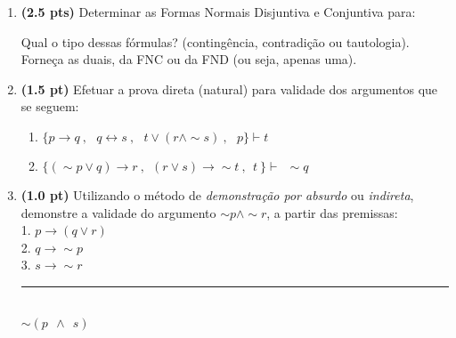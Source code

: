 \documentclass[11pt, a4paper,final]{article}
\begin{document}
\begin{enumerate}

\item {\bf (2.5 pts)} Determinar as Formas Normais Disjuntiva e Conjuntiva para:

Qual o tipo dessas fórmulas? (contingência, contradição ou tautologia). Forneça as duais,
da FNC ou  da FND (ou seja, apenas uma).

\item {\bf (1.5 pt)} Efetuar a prova  direta (natural) para validade dos argumentos que se seguem: 


\begin{enumerate}
\item $\{p\rightarrow  q \: , \:\:\: q \leftrightarrow s \: , \:\:\:
 t \vee ( r \wedge \sim s)\: , \:\:\: p \} \vdash  t $ 
 
\item  $\{ ( \sim p \vee q) \rightarrow r \: ,
  \:\: (r \vee s)  \rightarrow \sim t \: ,
    \:\: t \:   \} \vdash \: \:  \sim  q $
    
\end{enumerate}

\begin{comment}
\begin{enumerate}
\item $\{p\rightarrow \sim q \: , \:\:\: \sim p \rightarrow (r \rightarrow \sim q)  \: , \:\:\:
 (\sim s \vee \sim r)\rightarrow \sim \sim q  \: , \:\:\: \sim s  \} \vdash  r $ 
 
\item  $\{ p \vee q \: ,
  \:\: q \rightarrow r \: ,
    \:\: p \rightarrow s \: ,
     \:\: \sim s   \} \vdash r \wedge (p \vee q) $
\end{enumerate}
\end{comment}  

\item {\bf (1.0 pt)} Utilizando o método de  {\em demonstração por absurdo} ou {\em indireta},
 demonstre a validade do   argumento $ \sim p \wedge \sim r $, a partir das premissas:
\\ 
1. $  p \rightarrow ( q \vee r ) $ \\
2. $ q \rightarrow \sim p $ \\
3. $ s \rightarrow \sim r  $ 
\vskip -8pt
\rule{0.25\textwidth}{1pt}\\
$\sim (p\:\: \wedge \:\:s) $



\end{enumerate}
\end{document}
